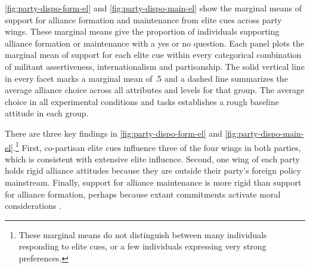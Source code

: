 \documentclass[12pt]{article}
\begin{document}
\autoref{fig:party-dispo-form-el} and \autoref{fig:party-dispo-main-el} show the marginal means of support for alliance formation and maintenance from elite cues across party wings.
These marginal means give the proportion of individuals supporting alliance formation or maintenance with a yes or no question.
Each panel plots the marginal mean of support for each elite cue within every categorical combination of militant assertiveness, internationalism and partisanship.
The solid vertical line in every facet marks a marginal mean of .5 and a dashed line summarizes the average alliance choice across all attributes and levels for that group.
The average choice in all experimental conditions and tasks establishes a rough baseline attitude in each group. 


There are three key findings in \autoref{fig:party-dispo-form-el} and \autoref{fig:party-dispo-main-el}.\footnote{These marginal means do not distinguish between many individuals responding to elite cues, or a few individuals expressing very strong preferences.} 
First, co-partisan elite cues influence three of the four wings in both parties, which is consistent with extensive elite influence. 
Second, one wing of each party holds rigid alliance attitudes because they are outside their party's foreign policy mainstream.  
Finally, support for alliance maintenance is more rigid than support for alliance formation, perhaps because extant commitments activate moral considerations \citep{TomzWeeks2021}. 
\end{document}
